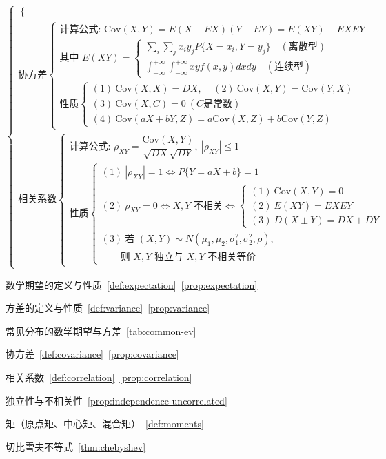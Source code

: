 ﻿\documentclass[lang=cn,11pt]{elegantbook}
\begin{document}
{\[\begin{cases}
\begin{cases}
\end{cases} \\
\text{协方差}
\begin{cases}
\text{计算公式: } \text{Cov}(X,Y)=E(X-EX)(Y-EY)=E(XY)-EXEY \\
\text{其中 } E(XY)=
\begin{cases}
\sum\limits_{i}\sum\limits_{j} x_i y_j P\{X=x_i,Y=y_j\} \quad (\text{离散型}) \\
\int_{-\infty}^{+\infty}\int_{-\infty}^{+\infty} xy f(x,y) dxdy \quad (\text{连续型})
\end{cases} \\
\text{性质}
\begin{cases}
(1)\ \text{Cov}(X,X)=DX ,~~~~~(2)\ \text{Cov}(X,Y)=\text{Cov}(Y,X) \\
(3)\ \text{Cov}(X,C)=0 \ (C \text{是常数}) \\
(4)\ \text{Cov}(aX+bY,Z)=a\text{Cov}(X,Z)+b\text{Cov}(Y,Z)
\end{cases}
\end{cases} \\
\text{相关系数}
\begin{cases}
\text{计算公式: } \rho_{XY}=\dfrac{\text{Cov}(X,Y)}{\sqrt{DX}\sqrt{DY}},\ |\rho_{XY}|\leqslant1 \\
\text{性质}
\begin{cases}
(1)\ |\rho_{XY}|=1 \Leftrightarrow P\{Y=aX+b\}=1 \\
(2)\ \rho_{XY}=0 \Leftrightarrow X,Y \text{ 不相关} \Leftrightarrow
\begin{cases}
(1)\ \text{Cov}(X,Y)=0 \\
(2)\ E(XY)=EXEY \\
(3)\ D(X\pm Y)=DX+DY
\end{cases} \\
(3)\ \text{若 } (X,Y)\sim N(\mu_1,\mu_2,\sigma_1^2,\sigma_2^2,\rho), \\
\qquad \text{则 } X,Y \text{ 独立与 } X,Y \text{ 不相关等价}
\end{cases}
\end{cases}
\end{cases}
\]
}

\begin{introduction}
    \item 数学期望的定义与性质~\ref{def:expectation}~\ref{prop:expectation}
    \item 方差的定义与性质~\ref{def:variance}~\ref{prop:variance}
    \item 常见分布的数学期望与方差~\ref{tab:common-ev}
    \item 协方差~\ref{def:covariance}~\ref{prop:covariance}
    \item 相关系数~\ref{def:correlation}~\ref{prop:correlation}
    \item 独立性与不相关性~\ref{prop:independence-uncorrelated}
    \item 矩（原点矩、中心矩、混合矩）~\ref{def:moments}
    \item 切比雪夫不等式~\ref{thm:chebyshev}
\end{introduction}
\end{document}

